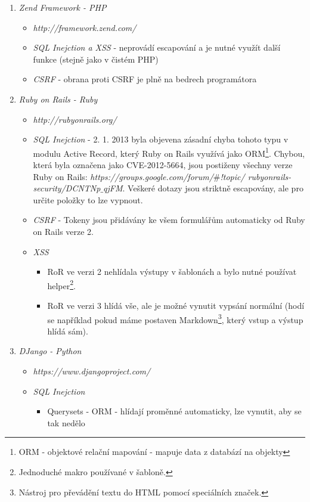 \documentclass[12pt, a4paper]{report}
\begin{document}
\begin{enumerate}
\item \textit{Zend Framework - PHP} 
\begin{itemize}
\item \textit{http://framework.zend.com/}
\item \textit{SQL Inejction a XSS} - neprovádí escapování a je nutné využít další funkce (stejně jako v čistém PHP)
\item \textit{CSRF} - obrana proti CSRF je plně na bedrech programátora
\end{itemize}
\item \textit{Ruby on Rails - Ruby}
\begin{itemize}
\item \textit{http://rubyonrails.org/}
\item \textit{SQL Inejction} - 2. 1. 2013 byla objevena zásadní chyba tohoto typu v modulu Active Record, který Ruby on Rails využívá jako ORM\footnote{ORM - objektové relační mapování - mapuje data z databází na objekty}. Chybou, která byla označena jako CVE-2012-5664, jsou postiženy všechny verze Ruby on Rails: \textit{https://groups.google.com/forum/$\#$!topic/ rubyonrails-security/DCNTNp$\_$qjFM}. Veškeré dotazy jsou striktně escapovány, ale pro určite položky to lze vypnout.
\item \textit{CSRF} - Tokeny jsou přidávány ke všem formulářům automaticky od Ruby on Rails verze 2.
\item \textit{XSS} 
\begin{itemize}
\item RoR ve verzi 2 nehlídala výstupy v šablonách a bylo nutné používat helper\footnote{Jednoduché makro používané v šabloně.}.
\item RoR ve verzi 3 hlídá vše, ale je možné vynutit vypsání normální (hodí se například pokud máme  postaven Markdown\footnote{Nástroj pro převádění textu do HTML pomocí speciálních značek.}, který vstup a výstup hlídá sám).
\end{itemize}
\end{itemize} 
\item \textit{DJango - Python}
\begin{itemize}
\item \textit{https://www.djangoproject.com/}
\item \textit{SQL Inejction}
\begin{itemize}
\item Querysets - ORM - hlídají proměnné automaticky, lze vynutit, aby se tak nedělo

\end{itemize}
\end{itemize}
\end{enumerate}
\end{document}
